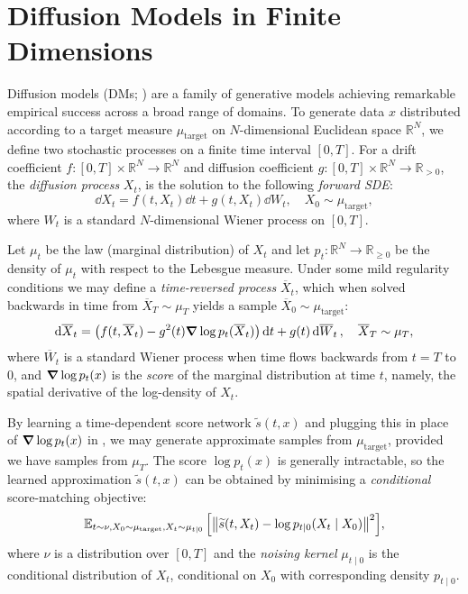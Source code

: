 \section{Diffusion Models in Finite Dimensions}
Diffusion models (DMs; \citealp{song2021scorebasedgenerativemodelingstochastic,hyvarinen2005estimation,ho2020denoisingdiffusionprobabilisticmodels}) are a family of generative models achieving remarkable empirical success across a broad range of domains. To generate data \(x\) distributed according to a target measure \(\mu_{\text{target}}\) on \(N\)-dimensional Euclidean space \(\mathbb{R}^{N}\), we define two stochastic processes on a finite time interval \([0, T]\). For a drift coefficient \(f : [0, T] \times \mathbb{R}^{N} \to \mathbb{R}^{N}\) and diffusion coefficient \(g : [0, T] \times \mathbb{R}^{N} \to \mathbb{R}_{> 0}\), the  \textit{diffusion process} \(X_{t}\), is the solution to the following \textit{forward SDE}:
\[
  \dd{X_{t}} = f(t, X_{t}) \dd{t} + g(t, X_{t}) \dd{W_{t}},\quad X_{0} \sim \mu_{\text{target}},
\]
where \(W_{t}\) is a standard \(N\)-dimensional Wiener process on \([0, T]\).

Let \(\mu_{t}\) be the law (marginal distribution) of \(X_{t}\) and let \(p_{t}: \mathbb{R}^{N} \to \mathbb{R}_{\geq 0}\) be the density of \(\mu_{t}\) with respect to the Lebesgue measure. Under some mild regularity conditions \citep{anderson1982reverse} we may define a \textit{time-reversed process} \(\overline{X}_{t}\), which when solved backwards in time from \(\overline{X}_{T} \sim \mu_{T}\) yields a sample \(\overline{X}_{0} \sim \mu_{\text{target}}\):
\begin{equation}
  \dd{ \overline{X}_{t}} = \qty(f(t, \overline{X}_{t}) - g^{2}(t) \grad \log p_{t}(\overline{X}_{t}))\dd{t} + g(t) \dd{ \overline{W}_{t}},  \quad \overline{X}_{T} \sim \mu_{T}, \label{eqn:dm-reverse}
\end{equation}
where \( \overline{W}_{t}\) is a standard Wiener process when time flows backwards from \(t = T\) to \(0\), and \(\grad \log p_{t}(x)\) is the \textit{score} of the marginal distribution at time \(t\), namely, the spatial derivative of the log-density of \(X_{t}\).

By learning a time-dependent score network \(\widetilde{s}(t, x)\) and plugging this in place of \(\grad \log p_{t}(x)\) in , we may generate approximate samples from \(\mu_{\text{target}}\), provided we have samples from \(\mu_{T}\). The score \(\log p_{t}(x) \) is generally intractable, so the learned approximation \(\widetilde{s}(t, x)\) can be obtained by minimising a \textit{conditional} score-matching objective:
\begin{equation}
  \mathop{\mathbb{E}_{t\sim \nu, X_{0} \sim \mu_{\text{target}}, X_{t} \sim \mu_{t \mid 0}}}\qty[\norm{ \widetilde{s}(t, X_{t}) - \log p_{t \mid 0}(X_{t} \mid X_{0}) }^{2}], \label{eqn:smo}
\end{equation}
where \(\nu\) is a distribution over \([0, T]\) and the \textit{noising kernel} \(\mu_{t \mid 0}\) is the conditional distribution of \(X_{t}\), conditional on \(X_{0}\) with corresponding density \(p_{t \mid 0}\).

